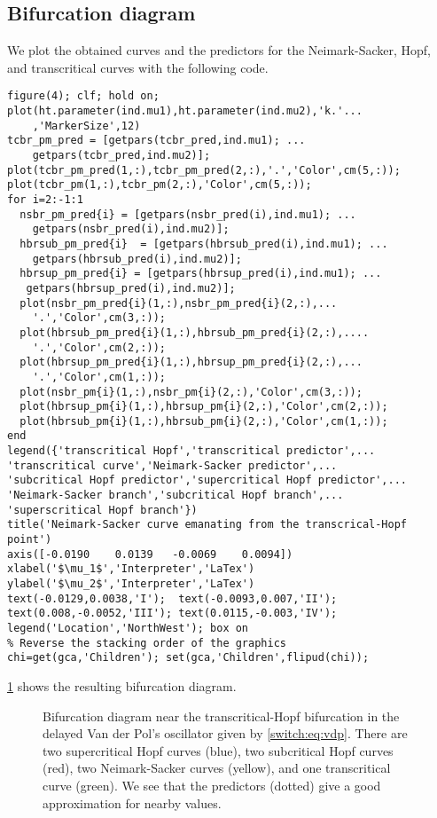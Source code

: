\subsection{Bifurcation diagram}
We plot the obtained curves and the predictors for the Neimark-Sacker, Hopf, and transcritical curves with the following code.
\begin{lstlisting}[style=customMatlab]
%% Plot comparing computed and predicted curves
figure(4); clf; hold on;
plot(ht.parameter(ind.mu1),ht.parameter(ind.mu2),'k.'...
    ,'MarkerSize',12)
tcbr_pm_pred = [getpars(tcbr_pred,ind.mu1); ...
    getpars(tcbr_pred,ind.mu2)];
plot(tcbr_pm_pred(1,:),tcbr_pm_pred(2,:),'.','Color',cm(5,:));
plot(tcbr_pm(1,:),tcbr_pm(2,:),'Color',cm(5,:));
for i=2:-1:1
  nsbr_pm_pred{i} = [getpars(nsbr_pred(i),ind.mu1); ...
    getpars(nsbr_pred(i),ind.mu2)];
  hbrsub_pm_pred{i}  = [getpars(hbrsub_pred(i),ind.mu1); ...
    getpars(hbrsub_pred(i),ind.mu2)];
  hbrsup_pm_pred{i} = [getpars(hbrsup_pred(i),ind.mu1); ...
   getpars(hbrsup_pred(i),ind.mu2)];
  plot(nsbr_pm_pred{i}(1,:),nsbr_pm_pred{i}(2,:),...
    '.','Color',cm(3,:));
  plot(hbrsub_pm_pred{i}(1,:),hbrsub_pm_pred{i}(2,:),....
    '.','Color',cm(2,:));
  plot(hbrsup_pm_pred{i}(1,:),hbrsup_pm_pred{i}(2,:),...
    '.','Color',cm(1,:));
  plot(nsbr_pm{i}(1,:),nsbr_pm{i}(2,:),'Color',cm(3,:));
  plot(hbrsup_pm{i}(1,:),hbrsup_pm{i}(2,:),'Color',cm(2,:));
  plot(hbrsub_pm{i}(1,:),hbrsub_pm{i}(2,:),'Color',cm(1,:));
end
legend({'transcritical Hopf','transcritical predictor',...
'transcritical curve','Neimark-Sacker predictor',...
'subcritical Hopf predictor','supercritical Hopf predictor',...
'Neimark-Sacker branch','subcritical Hopf branch',...
'superscritical Hopf branch'})
title('Neimark-Sacker curve emanating from the transcrical-Hopf point')
axis([-0.0190    0.0139   -0.0069    0.0094])
xlabel('$\mu_1$','Interpreter','LaTex')
ylabel('$\mu_2$','Interpreter','LaTex')
text(-0.0129,0.0038,'I');  text(-0.0093,0.007,'II');
text(0.008,-0.0052,'III'); text(0.0115,-0.003,'IV');
legend('Location','NorthWest'); box on
% Reverse the stacking order of the graphics
chi=get(gca,'Children'); set(gca,'Children',flipud(chi));
\end{lstlisting}
\cref{switch:sm:fig:HT_bifurcation_diagram} shows the resulting bifurcation diagram.

%
\begin{figure}[ht]
\centering
{}
\caption{\label{switch:sm:fig:HT_bifurcation_diagram} Bifurcation diagram near the transcritical-Hopf bifurcation in the delayed Van der Pol's oscillator given by \cref{switch:eq:vdp}. There are two supercritical Hopf curves (blue), two subcritical Hopf curves (red), two Neimark-Sacker curves (yellow), and one transcritical curve (green).  We see that the predictors (dotted) give a good approximation for nearby values.}
\end{figure}

